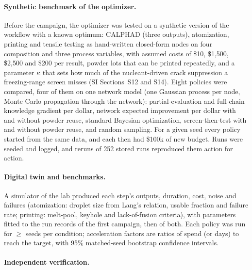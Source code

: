 \documentclass[11pt]{article}
\begin{document}
\paragraph{Synthetic benchmark of the optimizer.} Before the campaign, the
optimizer was tested on a synthetic version of the workflow with a known
optimum: CALPHAD (three outputs), atomization, printing and tensile testing as
hand-written closed-form nodes on four composition and three process variables,
with assumed costs of \$10, \$1,500, \$2,500 and \$200 per result, powder lots
that can be printed repeatedly, and a parameter $\kappa$ that sets how much of
the nucleant-driven crack suppression\cite{martin2017} a freezing-range
screen\cite{kou2015} misses (SI Sections~S12 and S14). Eight policies were
compared, four of them on one network model (one Gaussian process per node,
Monte Carlo propagation through the network\cite{astudillo2021,balandat2020}):
partial-evaluation and full-chain knowledge gradient per
dollar,\cite{buathong2024} network expected improvement per dollar with and
without powder reuse,\cite{astudillo2021} standard Bayesian optimization,
screen-then-test with and without powder reuse, and random sampling. For a given
seed every policy started from the same data, and each then had \$100k of new
budget. Runs were seeded and logged, and reruns of 252 stored runs reproduced
them action for action.\bofncite

\paragraph{Digital twin and benchmarks.}
A simulator of the lab produced each step's outputs, duration, cost, noise and
failures (atomization: droplet size from Lang's relation,\cite{lang1962}
usable fraction and failure rate; printing: melt-pool, keyhole and
lack-of-fusion criteria\cite{king2014,tang2017}), with parameters fitted to the
run records of the first campaign, then of both.\cite{mukherjee2019,gunasegaram2021}
Each policy was run for $\ge$ seeds per condition; acceleration factors
are ratios of spend (or days) to reach the target, with 95\% matched-seed
bootstrap confidence intervals. 

\paragraph{Independent verification.}
\end{document}
